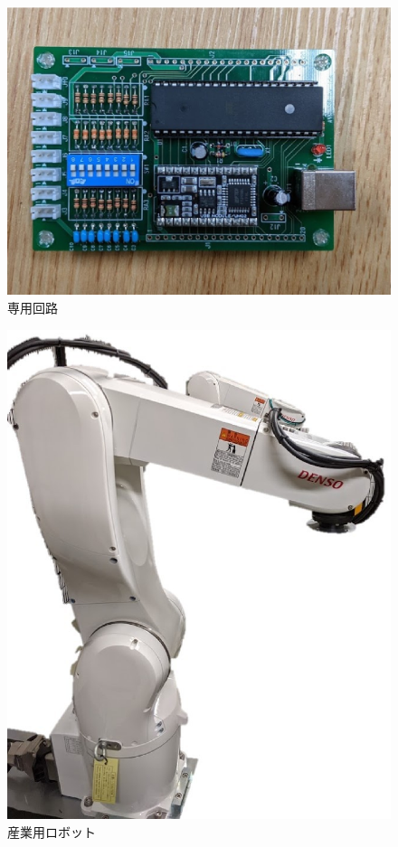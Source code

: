 \begin{figure}[h]
 \begin{center}
  \includegraphics[scale=0.5]{../fig/eps/ina_kairo.eps}
 \caption{専用回路}
  \label{fig::ina_kairo}
 \end{center}
\end{figure}

\begin{figure}[h]
 \begin{center}
  \includegraphics[scale=0.5]{../fig/eps/robo.eps}
 \caption{産業用ロボット}
  \label{fig::robo}
 \end{center}
\end{figure}

